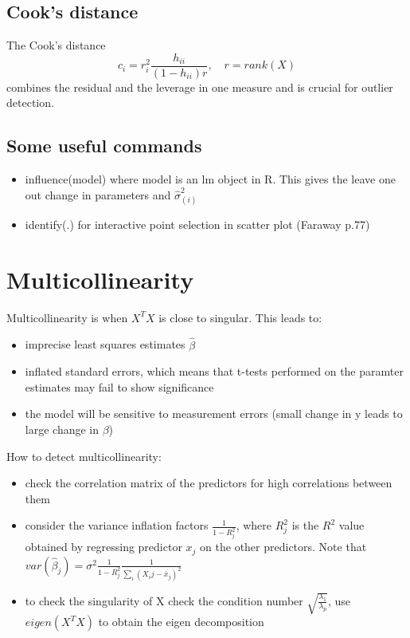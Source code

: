 \documentclass{article}
\begin{document}
\subsection{Cook's distance}
The Cook's distance
$$c_i = r^2_i \frac{h_{ii}}{(1-h_{ii})r}, \quad r = rank(X)$$
combines the residual and the leverage in one measure and is crucial for outlier detection. 

\subsection{Some useful commands}
\begin{itemize}
    \item influence(model) where model is an lm object in R. This gives the leave one out change in parameters and $\hat{\sigma}_{(i)}^2$
    \item identify(.) for interactive point selection in scatter plot (Faraway p.77)
\end{itemize}


\section{Multicollinearity}
Multicollinearity is when $X^TX$ is close to singular. This leads to:
\begin{itemize}
    \item imprecise least squares estimates $\hat{\beta}$
    \item inflated standard errors, which means that t-tests performed on the paramter estimates may fail to show significance
    \item the model will be sensitive to measurement errors (small change in y leads to large change in $\beta$)
\end{itemize}
How to detect multicollinearity:
\begin{itemize}
    \item check the correlation matrix of the predictors for high correlations between them
    \item consider the variance inflation factors $\frac{1}{1-R_j^2}$, where $R_j^2$ is the $R^2$ value obtained by regressing predictor $x_j$ on the other predictors. Note that $var(\hat{\beta}_j) = \sigma^2 \frac{1}{1-R^2_j} \frac{1}{\sum_i (X_ij - \bar{x}_j)^2}$
    \item to check the singularity of X check the condition number $\sqrt{\frac{\lambda_1}{\lambda_p}}$, use $eigen(X^TX)$ to obtain the eigen decomposition
\end{itemize}
\end{document}
